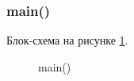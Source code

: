 \subsubsection{main()}

Блок-схема на рисунке \ref{fig:main}.

\begin{figure}[h]
    \caption{main()}
    \label{fig:main}
\end{figure}





\newpage